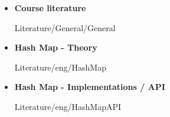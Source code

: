 \begin{frame}{\LectureFurtherLiterature}
  \begin{itemize}
    \item
      \textbf{Course literature}
      \begin{btSect}{Literature/General/General}
        \btPrintAll
      \end{btSect}
  \end{itemize}
\end{frame}


\begin{frame}{\LectureFurtherLiterature}
  \begin{itemize}
    \item
      \textbf{Hash Map - Theory}
      \begin{btSect}{Literature/eng/HashMap}
        \btPrintAll
      \end{btSect}
    \item
      \textbf{Hash Map - Implementations / API}
      \begin{btSect}{Literature/eng/HashMapAPI}
        \btPrintAll
      \end{btSect}
  \end{itemize}
\end{frame}
